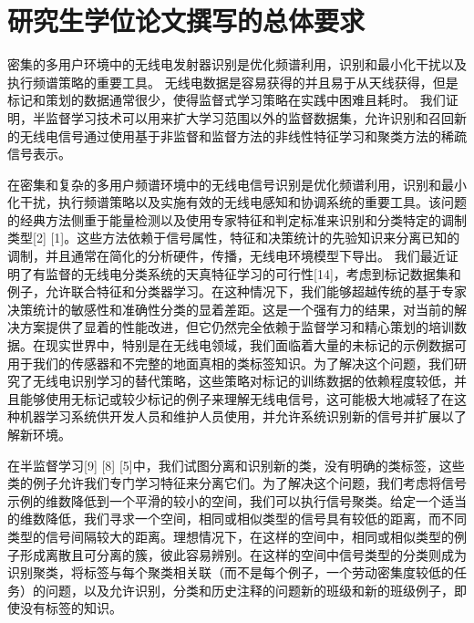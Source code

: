 
\chapter{研究生学位论文撰写的总体要求}
密集的多用户环境中的无线电发射器识别是优化频谱利用，识别和最小化干扰以及执行频谱策略的重要工具。 无线电数据是容易获得的并且易于从天线获得，但是标记和策划的数据通常很少，使得监督式学习策略在实践中困难且耗时。 我们证明，半监督学习技术可以用来扩大学习范围以外的监督数据集，允许识别和召回新的无线电信号通过使用基于非监督和监督方法的非线性特征学习和聚类方法的稀疏信号表示。\par

在密集和复杂的多用户频谱环境中的无线电信号识别是优化频谱利用，识别和最小化干扰，执行频谱策略以及实施有效的无线电感知和协调系统的重要工具。该问题的经典方法侧重于能量检测以及使用专家特征和判定标准来识别和分类特定的调制类型[2] [1]。这些方法依赖于信号属性，特征和决策统计的先验知识来分离已知的调制，并且通常在简化的分析硬件，传播，无线电环境模型下导出。
我们最近证明了有监督的无线电分类系统的天真特征学习的可行性[14]，考虑到标记数据集和例子，允许联合特征和分类器学习。在这种情况下，我们能够超越传统的基于专家决策统计的敏感性和准确性分类的显着差距。这是一个强有力的结果，对当前的解决方案提供了显着的性能改进，但它仍然完全依赖于监督学习和精心策划的培训数据。在现实世界中，特别是在无线电领域，我们面临着大量的未标记的示例数据可用于我们的传感器和不完整的地面真相的类标签知识。为了解决这个问题，我们研究了无线电识别学习的替代策略，这些策略对标记的训练数据的依赖程度较低，并且能够使用无标记或较少标记的例子来理解无线电信号，这可能极大地减轻了在这种机器学习系统供开发人员和维护人员使用，并允许系统识别新的信号并扩展以了解新环境。\par

在半监督学习[9] [8] [5]中，我们试图分离和识别新的类，没有明确的类标签，这些类的例子允许我们专门学习特征来分离它们。为了解决这个问题，我们考虑将信号示例的维数降低到一个平滑的较小的空间，我们可以执行信号聚类。给定一个适当的维数降低，我们寻求一个空间，相同或相似类型的信号具有较低的距离，而不同类型的信号间隔较大的距离。理想情况下，在这样的空间中，相同或相似类型的例子形成离散且可分离的簇，彼此容易辨别。在这样的空间中信号类型的分类则成为识别聚类，将标签与每个聚类相关联（而不是每个例子，一个劳动密集度较低的任务）的问题，以及允许识别，分类和历史注释的问题新的班级和新的班级例子，即使没有标签的知识。\par

